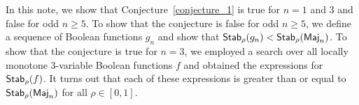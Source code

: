 \documentclass[11pt]{article}
\newcommand{\sym}[1]{{\sf #1}}
\begin{document}
In this note, we show that Conjecture~\ref{conjecture_1} is true for $n=1$ and 3 and false for odd $n\geq 5$. To show that the conjecture is false for odd $n\geq 5$, we define a
sequence of Boolean functions $g_n$ and show that $\sym{Stab}_{\rho}(g_n)<\sym{Stab}_{\rho}(\sym{Maj}_{n})$. To show that the conjecture is true for $n=3$, we employed a
search over all locally monotone 3-variable Boolean functions $f$ and obtained the expressions for $\sym{Stab}_{\rho}(f)$. It turns out that each of these
expressions is greater than or equal to $\sym{Stab}_{\rho}(\sym{Maj}_{n})$ for all $\rho\in [0,1]$.

\end{document}
